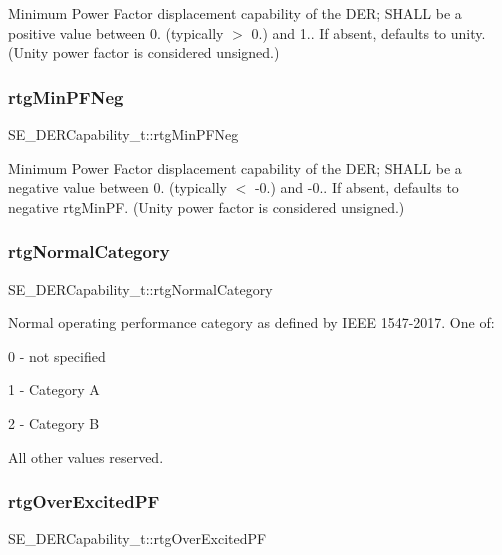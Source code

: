 Minimum Power Factor displacement capability of the D\+ER; S\+H\+A\+LL be a positive value between 0. (typically $>$ 0.) and 1.. If absent, defaults to unity. (Unity power factor is considered unsigned.) \mbox{\label{group__DERCapability_gaebcb9b5c1b7df73c7b4eca49b090d6c3}} 
\subsubsection{\texorpdfstring{rtg\+Min\+P\+F\+Neg}{rtgMinPFNeg}}
{\footnotesize\ttfamily S\+E\+\_\+\+D\+E\+R\+Capability\+\_\+t\+::rtg\+Min\+P\+F\+Neg}

Minimum Power Factor displacement capability of the D\+ER; S\+H\+A\+LL be a negative value between 0. (typically $<$ -\/0.) and -\/0.. If absent, defaults to negative rtg\+Min\+PF. (Unity power factor is considered unsigned.) \mbox{\label{group__DERCapability_gacc4601c0a325f5ddfc49dfb2d8505fe6}} 
\subsubsection{\texorpdfstring{rtg\+Normal\+Category}{rtgNormalCategory}}
{\footnotesize\ttfamily S\+E\+\_\+\+D\+E\+R\+Capability\+\_\+t\+::rtg\+Normal\+Category}

Normal operating performance category as defined by I\+E\+EE 1547-\/2017. One of\+:

0 -\/ not specified

1 -\/ Category A

2 -\/ Category B

All other values reserved. \mbox{\label{group__DERCapability_ga09cc0b98cc28ab8552ef88162516fc1f}} 
\subsubsection{\texorpdfstring{rtg\+Over\+Excited\+PF}{rtgOverExcitedPF}}
{\footnotesize\ttfamily S\+E\+\_\+\+D\+E\+R\+Capability\+\_\+t\+::rtg\+Over\+Excited\+PF}

